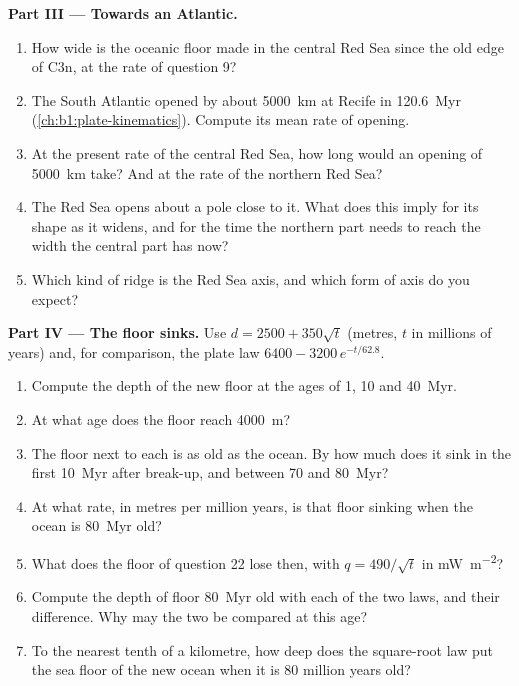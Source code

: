 \begin{problem}
\medskip
\noindent\textbf{Part III --- Towards an Atlantic.}
\begin{enumerate}[resume]
  \item How wide is the oceanic floor made in the central Red Sea since the old
        edge of C3n, at the rate of question 9?
  \item The South Atlantic opened by about \qty{5000}{km} at Recife in
        \qty{120.6}{Myr} (\cref{ch:b1:plate-kinematics}). Compute its mean
        rate of opening.
  \item At the present rate of the central Red Sea, how long would an opening
        of \qty{5000}{km} take? And at the rate of the northern Red Sea?
  \item The Red Sea opens about a pole close to it. What does this imply for
        its shape as it widens, and for the time the northern part needs to
        reach the width the central part has now?
  \item Which kind of ridge is the Red Sea axis, and which form of axis do you
        expect?
\end{enumerate}

\medskip
\noindent\textbf{Part IV --- The floor sinks.} Use $d = 2500 + 350\sqrt t$
(metres, $t$ in millions of years) and, for comparison, the plate law
$6400 - 3200\,e^{-t/62.8}$.
\begin{enumerate}[resume]
  \item Compute the depth of the new floor at the ages of 1, 10 and
        \qty{40}{Myr}.
  \item At what age does the floor reach \qty{4000}{m}?
  \item The floor next to each  is as old as the ocean. By how
        much does it sink in the first \qty{10}{Myr} after break-up, and between
        70 and \qty{80}{Myr}?
  \item At what rate, in metres per million years, is that floor sinking when
        the ocean is \qty{80}{Myr} old?
  \item What  does the floor of question 22 lose then, with
        $q = 490/\sqrt t$ in \unit{mW.m^{-2}}?
  \item Compute the depth of floor \qty{80}{Myr} old with each of the two
        laws, and their difference. Why may the two be compared at this age?
  \item To the nearest tenth of a kilometre, how deep does the square-root law
        put the sea floor of the new ocean when it is 80 million years old?
\end{enumerate}
\end{problem}
